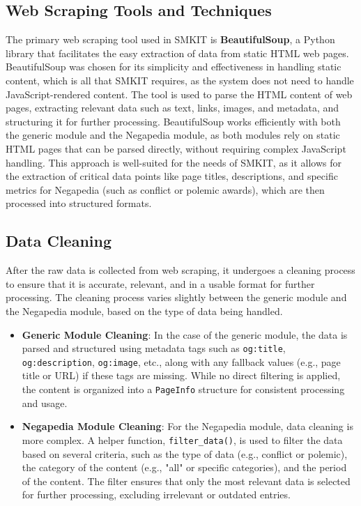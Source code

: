 \subsection{Web Scraping Tools and Techniques}
\label{subsec:web_scraping_tools_and_techniques}
The primary web scraping tool used in SMKIT is \textbf{BeautifulSoup}, a Python library that facilitates the easy extraction of data from static HTML web pages. BeautifulSoup was chosen for its simplicity and effectiveness in handling static content, which is all that SMKIT requires, as the system does not need to handle JavaScript-rendered content.
The tool is used to parse the HTML content of web pages, extracting relevant data such as text, links, images, and metadata, and structuring it for further processing. BeautifulSoup works efficiently with both the generic module and the Negapedia module, as both modules rely on static HTML pages that can be parsed directly, without requiring complex JavaScript handling.
This approach is well-suited for the needs of SMKIT, as it allows for the extraction of critical data points like page titles, descriptions, and specific metrics for Negapedia (such as conflict or polemic awards), which are then processed into structured formats.

\subsection{Data Cleaning}
\label{subsec:data_cleaning}
After the raw data is collected from web scraping, it undergoes a cleaning process to ensure that it is accurate, relevant, and in a usable format for further processing. The cleaning process varies slightly between the generic module and the Negapedia module, based on the type of data being handled.

\begin{itemize}
    \item \textbf{Generic Module Cleaning}: In the case of the generic module, the data is parsed and structured using metadata tags such as \texttt{og:title}, \texttt{og:description}, \texttt{og:image}, etc., along with any fallback values (e.g., page title or URL) if these tags are missing. While no direct filtering is applied, the content is organized into a \texttt{PageInfo} structure for consistent processing and usage.
    
    \item \textbf{Negapedia Module Cleaning}: For the Negapedia module, data cleaning is more complex. A helper function, \texttt{filter\_data()}, is used to filter the data based on several criteria, such as the type of data (e.g., conflict or polemic), the category of the content (e.g., "all" or specific categories), and the period of the content. The filter ensures that only the most relevant data is selected for further processing, excluding irrelevant or outdated entries.
\end{itemize}


